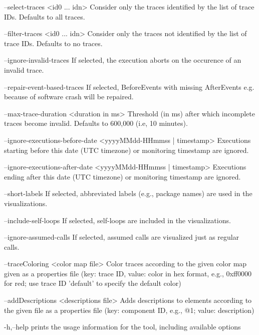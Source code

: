     --select-traces <id0 ... idn>
        Consider only the traces identified by the list of trace IDs.
        Defaults to all traces.

    --filter-traces <id0 ... idn>
        Consider only the traces not identified by the list of trace IDs.
        Defaults to no traces.

    --ignore-invalid-traces
        If selected, the execution aborts on the occurence of an invalid
        trace.

    --repair-event-based-traces
        If selected, BeforeEvents with missing AfterEvents e.g. because of
        software crash will be repaired.

    --max-trace-duration <duration in ms>
        Threshold (in ms) after which incomplete traces become invalid.
        Defaults to 600,000 (i.e, 10 minutes).

    --ignore-executions-before-date <yyyyMMdd-HHmmss | timestamp>
        Executions starting before this date (UTC timezone) or monitoring
        timestamp are ignored.

    --ignore-executions-after-date <yyyyMMdd-HHmmss | timestamp>
        Executions ending after this date (UTC timezone) or monitoring
        timestamp  are ignored.

    --short-labels
        If selected, abbreviated labels (e.g., package names) are used in
        the visualizations.

    --include-self-loops
        If selected, self-loops are included in the visualizations.

    --ignore-assumed-calls
        If selected, assumed calls are visualized just as regular calls.

    --traceColoring <color map file>
        Color traces according to the given color map given as a
        properties file (key: trace ID, value: color in hex format, e.g.,
        0xff0000 for red; use trace ID 'default' to specify the default
        color)

    --addDescriptions <descriptions file>
        Adds descriptions to elements according to the given file as a
        properties file (key: component ID, e.g., @1; value: description)

 -h,--help
        prints the usage information for the tool, including available
        options
